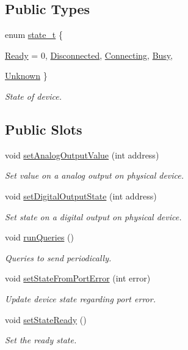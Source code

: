 \subsection*{Public Types}
\begin{DoxyCompactItemize}
\item 
enum \hyperlink{classmdt_device_a39c301b1fda803dba0c9ab98164a9d1e}{state\_\-t} \{ \par
\hyperlink{classmdt_device_a39c301b1fda803dba0c9ab98164a9d1ea577f509c27c399a211c5dc18c0235b69}{Ready} =  0, 
\hyperlink{classmdt_device_a39c301b1fda803dba0c9ab98164a9d1eae06fa1b4e5872df7470aeed0878a2947}{Disconnected}, 
\hyperlink{classmdt_device_a39c301b1fda803dba0c9ab98164a9d1ead8adc8658ebaa24f7525fe18558de4c1}{Connecting}, 
\hyperlink{classmdt_device_a39c301b1fda803dba0c9ab98164a9d1ea4a064f3dc9a486991b3ec09127b1c42a}{Busy}, 
\par
\hyperlink{classmdt_device_a39c301b1fda803dba0c9ab98164a9d1ea9e9410b52d18a2c4da60748530709f09}{Unknown}
 \}
\begin{DoxyCompactList}\small\item\em State of device. \end{DoxyCompactList}\end{DoxyCompactItemize}
\subsection*{Public Slots}
\begin{DoxyCompactItemize}
\item 
void \hyperlink{classmdt_device_a40234a70a37b097baa48bdfbb402cdc4}{setAnalogOutputValue} (int address)
\begin{DoxyCompactList}\small\item\em Set value on a analog output on physical device. \end{DoxyCompactList}\item 
void \hyperlink{classmdt_device_a83b170f1805a05101409bb6d8e15d03a}{setDigitalOutputState} (int address)
\begin{DoxyCompactList}\small\item\em Set state on a digital output on physical device. \end{DoxyCompactList}\item 
void \hyperlink{classmdt_device_a14634fec6cd6bae810562b3bd88a5c05}{runQueries} ()
\begin{DoxyCompactList}\small\item\em Queries to send periodically. \end{DoxyCompactList}\item 
void \hyperlink{classmdt_device_ab77eb4c1bb50201e97a4dbd8b538659a}{setStateFromPortError} (int error)
\begin{DoxyCompactList}\small\item\em Update device state regarding port error. \end{DoxyCompactList}\item 
void \hyperlink{classmdt_device_a4eeda85bf0b10ddc9955a32199c00359}{setStateReady} ()
\begin{DoxyCompactList}\small\item\em Set the ready state. \end{DoxyCompactList}\end{DoxyCompactItemize}
